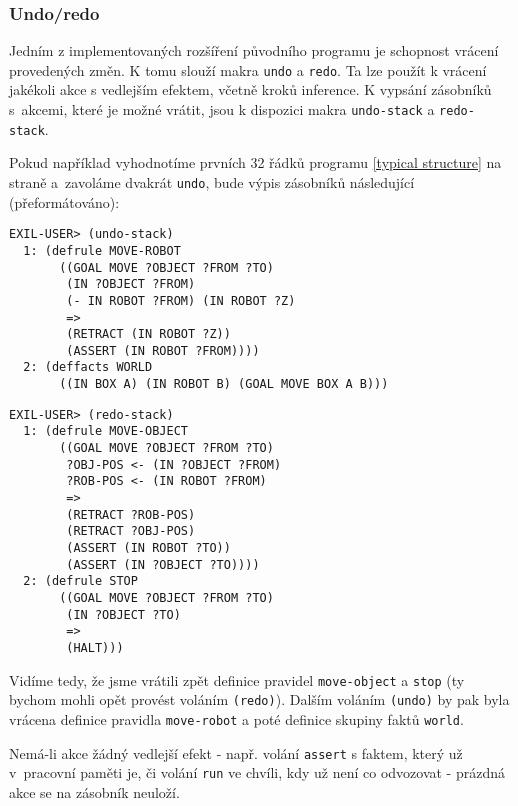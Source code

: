 \subsubsection{Undo/redo}
\label{undo}

Jedním z implementovaných rozšíření původního programu je schopnost vrácení
provedených změn. K tomu slouží makra \verb|undo| a \verb|redo|. Ta lze použít k
vrácení jakékoli akce s vedlejším efektem, včetně kroků inference. K vypsání
zásobníků s~akcemi, které je možné vrátit, jsou k dispozici makra
\verb|undo-stack| a \verb|redo-stack|.

Pokud například vyhodnotíme prvních 32 řádků programu \ref{typical structure} na
straně \pageref{typical structure} a~zavoláme dvakrát \verb|undo|, bude výpis
zásobníků následující (přeformátováno):
\begin{verbatim}
EXIL-USER> (undo-stack)
  1: (defrule MOVE-ROBOT
       ((GOAL MOVE ?OBJECT ?FROM ?TO)
        (IN ?OBJECT ?FROM)
        (- IN ROBOT ?FROM) (IN ROBOT ?Z)
        =>
        (RETRACT (IN ROBOT ?Z))
        (ASSERT (IN ROBOT ?FROM))))
  2: (deffacts WORLD
       ((IN BOX A) (IN ROBOT B) (GOAL MOVE BOX A B)))
\end{verbatim}
\begin{verbatim}
EXIL-USER> (redo-stack)
  1: (defrule MOVE-OBJECT
       ((GOAL MOVE ?OBJECT ?FROM ?TO)
        ?OBJ-POS <- (IN ?OBJECT ?FROM)
        ?ROB-POS <- (IN ROBOT ?FROM)
        =>
        (RETRACT ?ROB-POS)
        (RETRACT ?OBJ-POS)
        (ASSERT (IN ROBOT ?TO))
        (ASSERT (IN ?OBJECT ?TO))))
  2: (defrule STOP
       ((GOAL MOVE ?OBJECT ?FROM ?TO)
        (IN ?OBJECT ?TO)
        =>
        (HALT)))
\end{verbatim}
Vidíme tedy, že jsme vrátili zpět definice pravidel \verb|move-object| a
\verb|stop| (ty bychom mohli opět provést voláním \verb|(redo)|). Dalším voláním
\verb|(undo)| by pak byla vrácena definice pravidla \verb|move-robot| a poté
definice skupiny faktů \verb|world|.

Nemá-li akce žádný vedlejší efekt - např. volání \verb|assert| s faktem, který
už v~pracovní paměti je, či volání \verb|run| ve chvíli, kdy už není co
odvozovat - prázdná akce se na zásobník neuloží.
